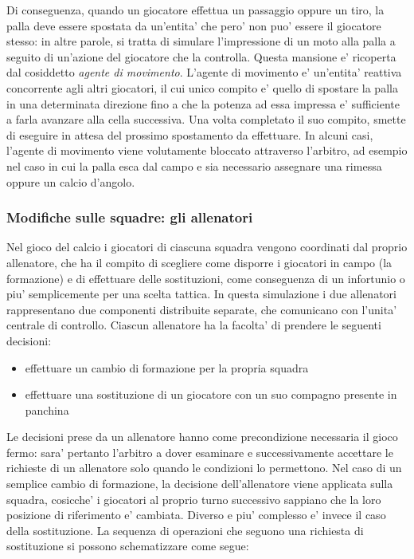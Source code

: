 Di conseguenza, quando un giocatore effettua un passaggio oppure un tiro, la palla deve essere spostata da un'entita' che pero' non puo' essere il giocatore stesso: in altre parole, si tratta di simulare l'impressione di un moto alla palla a seguito di un'azione del giocatore che la controlla. Questa mansione e' ricoperta dal cosiddetto \textit{agente di movimento}. L'agente di movimento e' un'entita' reattiva concorrente agli altri giocatori, il cui unico compito e' quello di spostare la palla in una determinata direzione fino a che la potenza ad essa impressa e' sufficiente a farla avanzare alla cella successiva. Una volta completato il suo compito, smette di eseguire in attesa del prossimo spostamento da effettuare. In alcuni casi, l'agente di movimento viene volutamente bloccato attraverso l'arbitro, ad esempio nel caso in cui la palla esca dal campo e sia necessario assegnare una rimessa oppure un calcio d'angolo.

\subsubsection{Modifiche sulle squadre: gli allenatori}
\label{sec:modello_squadre_allenatori}


Nel gioco del calcio i giocatori di ciascuna squadra vengono coordinati dal proprio allenatore, che ha il compito di scegliere come disporre i giocatori in campo (la formazione) e di effettuare delle sostituzioni, come conseguenza di un infortunio o piu' semplicemente per una scelta tattica. In questa simulazione i due allenatori rappresentano due componenti distribuite separate, che comunicano con l'unita' centrale di controllo. Ciascun allenatore ha la facolta' di prendere le seguenti decisioni:

\begin{itemize}
	\item effettuare un cambio di formazione per la propria squadra
	\item effettuare una sostituzione di un giocatore con un suo compagno presente in panchina
\end{itemize}

Le decisioni prese da un allenatore hanno come precondizione necessaria il gioco fermo: sara' pertanto l'arbitro a dover esaminare e successivamente accettare le richieste di un allenatore solo quando le condizioni lo permettono. Nel caso di un semplice cambio di formazione, la decisione dell'allenatore viene applicata sulla squadra, cosicche' i giocatori al proprio turno successivo sappiano che la loro posizione di riferimento e' cambiata. Diverso e piu' complesso e' invece il caso della sostituzione. La sequenza di operazioni che seguono una richiesta di sostituzione si possono schematizzare come segue:


